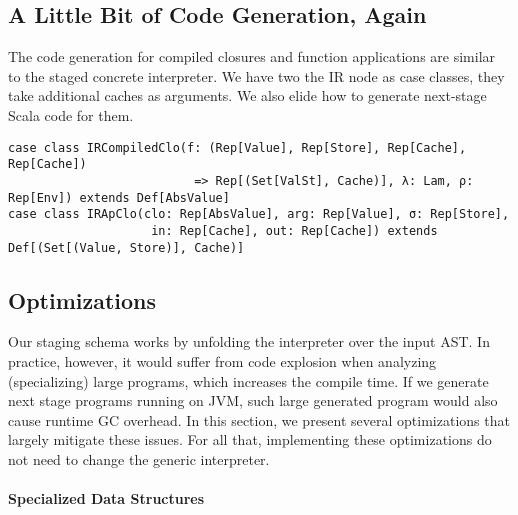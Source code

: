 \subsection{A Little Bit of Code Generation, Again}
The code generation for compiled closures and function applications are similar
to the staged concrete interpreter. We have two the IR node as case classes, they
take additional caches as arguments. We also elide how to generate next-stage Scala
code for them.
\begin{lstlisting}
case class IRCompiledClo(f: (Rep[Value], Rep[Store], Rep[Cache], Rep[Cache])
                          => Rep[(Set[ValSt], Cache)], λ: Lam, ρ: Rep[Env]) extends Def[AbsValue]
case class IRApClo(clo: Rep[AbsValue], arg: Rep[Value], σ: Rep[Store],
                    in: Rep[Cache], out: Rep[Cache]) extends Def[(Set[(Value, Store)], Cache)]
\end{lstlisting}

\subsection{Optimizations} \label{staged_ds}

\iffalse
Revision: Solving Practical Challenges.
theoretically, all the things should work nicely. Unfolding the interpreter over the AST.
But the generated code is blowed up. For example .... This should not affect the correctness,
but poses burden on the MSP system (ie LMS) and the next stage compiler/runtime (ie, scalac and JVM).
1) LMS becomes slower since a large IR graph is contructed during the staging.
2) Scalac becomes slower when reading a such large source code.
JVM has certain limitation on the size of a single method.

TODO: can we formulate selective caching as a partially-static data law.
TODO: lambda lifting for if
\fi

Our staging schema works by unfolding the interpreter over the input AST. In
practice, however, it would suffer from code explosion when analyzing
(specializing) large programs, which increases the compile time. If we generate
next stage programs running on JVM, such large generated program would also
cause runtime GC overhead. In this section, we present several optimizations
that largely mitigate these issues. For all that, implementing these
optimizations do not need to change the generic interpreter.

\paragraph{Specialized Data Structures}

